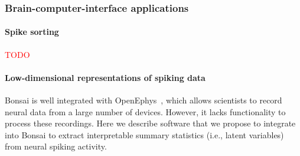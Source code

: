 \subsubsection{Brain-computer-interface applications}
\label{sec:bci}

\paragraph{Spike sorting}

\noindent\textcolor{red}{TODO}

\paragraph{Low-dimensional representations of spiking data}

Bonsai is well integrated with OpenEphys~\citep{siegleEtAl17}, which allows
scientists to record neural data from a large number of devices. However, it
lacks functionality to process these recordings. Here we describe software that
we propose to integrate into Bonsai to extract interpretable summary statistics
(i.e., latent variables) from neural spiking activity.

